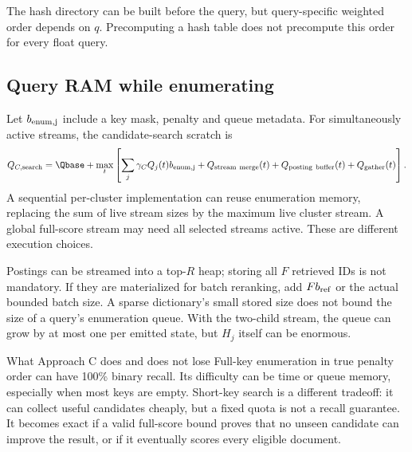 The hash directory can be built before the query, but query-specific weighted order depends
on $q$. Precomputing a hash table does not precompute this order for every float query.

\subsection{Query RAM while enumerating}
Let $b_{\rm enum,j}$ include a key mask, penalty and queue metadata. For simultaneously active
streams, the candidate-search scratch is
\begin{equation}
Q_{C,\rm search}=\Qbase+
 \max_t\left[\sum_j\gamma_C Q_j(t)b_{\rm enum,j}
             +Q_{\rm stream\ merge}(t)+Q_{\rm posting\ buffer}(t)
             +Q_{\rm gather}(t)\right].
\label{eq:keys-ram}
\end{equation}
A sequential per-cluster implementation can reuse enumeration memory, replacing the sum of
live stream sizes by the maximum live cluster stream. A global full-score stream may need
all selected streams active. These are different execution choices.

Postings can be streamed into a top-$R$ heap; storing all $F$ retrieved IDs is not mandatory.
If they are materialized for batch reranking, add $F b_{\rm ref}$ or the actual bounded batch
size. A sparse dictionary's small stored size does not bound the size of a query's enumeration
queue. With the two-child stream, the queue can grow by at most one per emitted state, but
$H_j$ itself can be enormous.

\begin{resultbox}{What Approach C does and does not lose}
Full-key enumeration in true penalty order can have 100\% binary recall. Its difficulty can
be time or queue memory, especially when most keys are empty. Short-key search is a different
tradeoff: it can collect useful candidates cheaply, but a fixed quota is not a recall guarantee.
It becomes exact if a valid full-score bound proves that no unseen candidate can improve the
result, or if it eventually scores every eligible document.
\end{resultbox}

